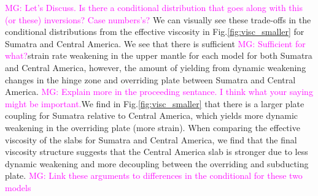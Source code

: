 \documentclass[12pt]{article}
\newcommand{\mgnote}[1]{\textcolor{magenta}{MG: #1}}
\begin{document}
{\mgnote{Let's Discuss. Is there a conditional distribution that goes along with this (or these) inversions? Case numbers's?}
We can visually see these trade-offs in the conditional distributions from the effective viscosity in Fig.\ref{fig:visc_smaller} for Sumatra and Central America. We see that there is sufficient \mgnote{Sufficient for what?}strain rate weakening in the upper mantle for each model for both Sumatra and Central America, however, the amount of yielding from dynamic weakening changes in the hinge zone and overriding plate between Sumatra and Central America. \mgnote{Explain more in the proceeding sentance. I think what your saying might be important.}We find in Fig.\ref{fig:visc_smaller} that there is a larger plate coupling for Sumatra relative to Central America, which  yields more dynamic weakening in the overriding plate (more strain). When comparing the effective viscosity of the slabs for Sumatra and Central America, we find that the final viscosity structure suggests that the Central America slab is stronger due to less dynamic weakening and more decoupling between the overriding and subducting plate. \mgnote{Link these arguments to differences in the conditional for these two models}



\begin{figure}[H]
\centering

\hspace{-1.0cm}


\end{figure}}
\end{document}
